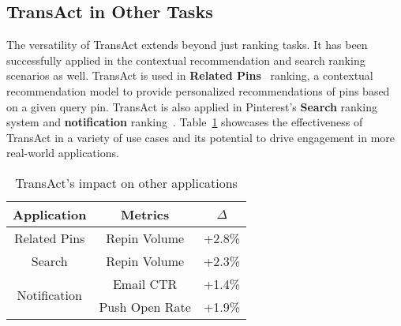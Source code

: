 \subsection{TransAct in Other Tasks}
The versatility of TransAct extends beyond just ranking tasks. It has been successfully applied in the contextual recommendation and search ranking scenarios as well. 
TransAct is used in \textbf{Related Pins}~\cite{related_pins} ranking, a contextual recommendation model to provide personalized recommendations of pins based on a given query pin. 
TransAct is also applied in Pinterest's \textbf{Search} ranking~\cite{search_blog} system and \textbf{notification} ranking~\cite{pins_notif}. Table~\ref{tab:other_app} showcases the effectiveness of TransAct in a variety of use cases and its potential to drive engagement in more real-world applications.

\begin{table}
  \caption{TransAct's impact on other applications}
  \label{tab:other_app}
  \begin{tabular}{ccc}
    \toprule
    Application & Metrics & $\Delta$\\
    \midrule
    Related Pins & Repin Volume & +2.8\%\\
    \midrule
     Search  & Repin Volume & +2.3\%\\
     \midrule
    \multirow{2}{*}{Notification }  & Email CTR &+1.4\%  \\
    & Push Open Rate &+1.9\% \\
  \bottomrule
\end{tabular}%
\end{table}

